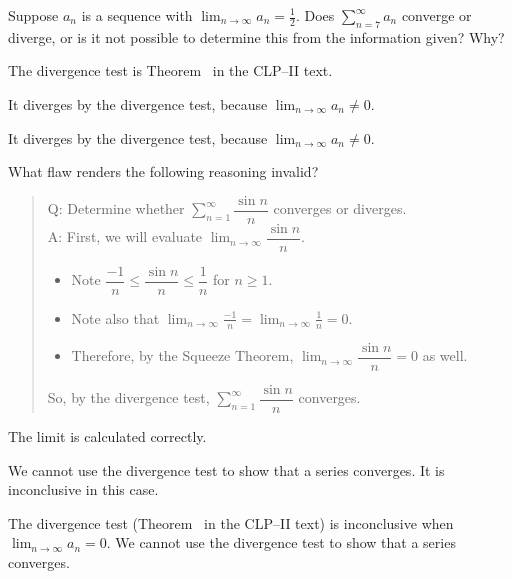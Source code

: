 \begin{question}
Suppose $a_n$ is a sequence with $\displaystyle\lim_{n \to \infty}a_n = \frac{1}{2}$. Does $\displaystyle\sum_{n=7}^\infty a_n$ converge or diverge, or is it not possible to determine this from the information given? Why?
\end{question}
\begin{hint}
The divergence test is Theorem~ in the CLP--II text.
\end{hint}
\begin{answer}
It diverges by the divergence test, because $\displaystyle\lim_{n \to \infty}a_n \neq 0$.
\end{answer}
\begin{solution}
It diverges by the divergence test, because $\displaystyle\lim_{n \to \infty}a_n \neq 0$.
\end{solution}



\begin{Mquestion}
What flaw renders the following reasoning invalid?
\begin{quote}\color{blue}
Q: Determine whether $\displaystyle\sum_{n=1}^\infty \dfrac{\sin n}{n}$ converges or diverges.\\
A: First, we will evaluate $\displaystyle\lim_{n \to \infty} \dfrac{\sin n}{n}$.
\begin{itemize}
\item Note $\dfrac{-1}{n} \leq \dfrac{\sin n}{n} \leq \dfrac{1}{n}$ for $n \ge 1$.
\item Note also that $\displaystyle\lim_{n \to \infty}\frac{-1}{n}=\displaystyle\lim_{n \to \infty}\frac{1}{n}=0$.
\item Therefore, by the Squeeze Theorem, $\displaystyle\lim_{n \to \infty} \dfrac{\sin n}{n}=0$ as well.
\end{itemize}
So, by the divergence test, $\displaystyle\sum_{n=1}^\infty \dfrac{\sin n}{n}$ converges.
\end{quote}
\end{Mquestion}
\begin{hint}
The limit is calculated correctly.
\end{hint}
\begin{answer}
We cannot use the divergence test to show that a series converges. It is inconclusive in this case.
\end{answer}
\begin{solution}
 The divergence test (Theorem~ in the CLP--II text) is inconclusive when $\displaystyle\lim_{n \to \infty}a_n=0$. We cannot use the divergence test to show that a series converges.
\end{solution}



